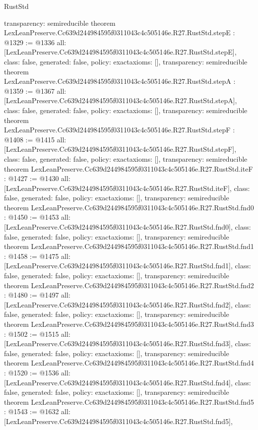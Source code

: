 \begin{lexlean}{RustStd}
\begin{coremodule}
{  transparency: semireducible
}
theorem LexLeanPreserve.Cc639d244984595f0311043c4c505146e.R27.RustStd.stepE : @1329 := @1336 {
  all: [LexLeanPreserve.Cc639d244984595f0311043c4c505146e.R27.RustStd.stepE],
  class: false,
  generated: false,
  policy: exact{axioms: []},
  transparency: semireducible
}
theorem LexLeanPreserve.Cc639d244984595f0311043c4c505146e.R27.RustStd.stepA : @1359 := @1367 {
  all: [LexLeanPreserve.Cc639d244984595f0311043c4c505146e.R27.RustStd.stepA],
  class: false,
  generated: false,
  policy: exact{axioms: []},
  transparency: semireducible
}
theorem LexLeanPreserve.Cc639d244984595f0311043c4c505146e.R27.RustStd.stepF : @1408 := @1415 {
  all: [LexLeanPreserve.Cc639d244984595f0311043c4c505146e.R27.RustStd.stepF],
  class: false,
  generated: false,
  policy: exact{axioms: []},
  transparency: semireducible
}
theorem LexLeanPreserve.Cc639d244984595f0311043c4c505146e.R27.RustStd.iteF : @1427 := @1430 {
  all: [LexLeanPreserve.Cc639d244984595f0311043c4c505146e.R27.RustStd.iteF],
  class: false,
  generated: false,
  policy: exact{axioms: []},
  transparency: semireducible
}
theorem LexLeanPreserve.Cc639d244984595f0311043c4c505146e.R27.RustStd.fnd0 : @1450 := @1453 {
  all: [LexLeanPreserve.Cc639d244984595f0311043c4c505146e.R27.RustStd.fnd0],
  class: false,
  generated: false,
  policy: exact{axioms: []},
  transparency: semireducible
}
theorem LexLeanPreserve.Cc639d244984595f0311043c4c505146e.R27.RustStd.fnd1 : @1458 := @1475 {
  all: [LexLeanPreserve.Cc639d244984595f0311043c4c505146e.R27.RustStd.fnd1],
  class: false,
  generated: false,
  policy: exact{axioms: []},
  transparency: semireducible
}
theorem LexLeanPreserve.Cc639d244984595f0311043c4c505146e.R27.RustStd.fnd2 : @1480 := @1497 {
  all: [LexLeanPreserve.Cc639d244984595f0311043c4c505146e.R27.RustStd.fnd2],
  class: false,
  generated: false,
  policy: exact{axioms: []},
  transparency: semireducible
}
theorem LexLeanPreserve.Cc639d244984595f0311043c4c505146e.R27.RustStd.fnd3 : @1502 := @1515 {
  all: [LexLeanPreserve.Cc639d244984595f0311043c4c505146e.R27.RustStd.fnd3],
  class: false,
  generated: false,
  policy: exact{axioms: []},
  transparency: semireducible
}
theorem LexLeanPreserve.Cc639d244984595f0311043c4c505146e.R27.RustStd.fnd4 : @1520 := @1536 {
  all: [LexLeanPreserve.Cc639d244984595f0311043c4c505146e.R27.RustStd.fnd4],
  class: false,
  generated: false,
  policy: exact{axioms: []},
  transparency: semireducible
}
theorem LexLeanPreserve.Cc639d244984595f0311043c4c505146e.R27.RustStd.fnd5 : @1543 := @1632 {
  all: [LexLeanPreserve.Cc639d244984595f0311043c4c505146e.R27.RustStd.fnd5],
}
\end{coremodule}
\end{lexlean}
